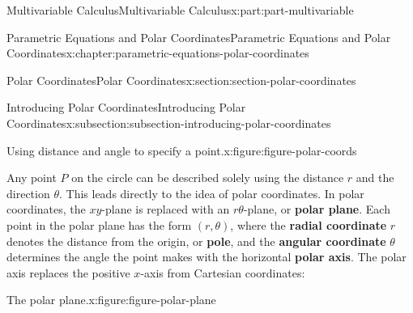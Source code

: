\documentclass[twoside,10pt,]{book}
\newcommand{\terminology}[1]{\textbf{#1}}
\numberwithin{equation}{part}
\begin{document}
\begin{partptx}{Multivariable Calculus}{}{Multivariable Calculus}{}{}{x:part:part-multivariable}
\begin{chapterptx}{Parametric Equations and Polar Coordinates}{}{Parametric Equations and Polar Coordinates}{}{}{x:chapter:parametric-equations-polar-coordinates}
\begin{sectionptx}{Polar Coordinates}{}{Polar Coordinates}{}{}{x:section:section-polar-coordinates}
\begin{subsectionptx}{Introducing Polar Coordinates}{}{Introducing Polar Coordinates}{}{}{x:subsection:subsection-introducing-polar-coordinates}
\begin{figureptx}{Using distance and angle to specify a point.}{x:figure:figure-polar-coords}{}%
\begin{image}{0}{1}{0}%
%
\end{image}%
\tcblower
\end{figureptx}%
Any point \(P\) on the circle can be described solely using the distance \(r\) and the direction \(\theta\). This leads directly to the idea of polar coordinates. In polar coordinates, the \(xy\)-plane is replaced with an \(r\theta\)-plane, or \terminology{polar plane}. Each point in the polar plane has the form \((r,\theta)\), where the \terminology{radial coordinate} \(r\) denotes the distance from the origin, or \terminology{pole}, and the \terminology{angular coordinate} \(\theta\) determines the angle the point makes with the horizontal \terminology{polar axis}. The polar axis replaces the positive \(x\)-axis from Cartesian coordinates:%
\begin{figureptx}{The polar plane.}{x:figure:figure-polar-plane}{}%
\begin{image}{0}{1}{0}%
\end{image}
\end{figureptx}
\end{subsectionptx}
\end{sectionptx}
\end{chapterptx}
\end{partptx}
\end{document}
